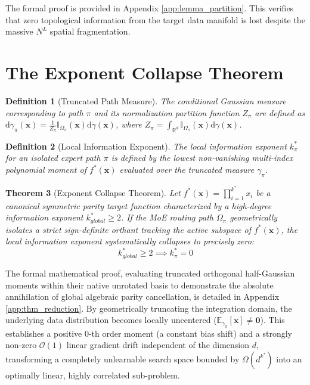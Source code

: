 \documentclass{article}
\newcommand{\E}{\mathbb{E}}
\newcommand{\R}{\mathbb{R}}
\newcommand{\1}{\mathbb{I}}
\newcommand{\diff}{\mathrm{d}}
\newcommand{\calO}{\mathcal{O}}
\newcommand{\bx}{\mathbf{x}}
\newtheorem{theorem}{Theorem}[section]
\newtheorem{definition}[theorem]{Definition}
\begin{document}
The formal proof is provided in Appendix \ref{app:lemma_partition}. This verifies that zero topological information from the target data manifold is lost despite the massive $N^L$ spatial fragmentation. 

\section{The Exponent Collapse Theorem}
\label{sec:collapse}

\begin{definition}[Truncated Path Measure] \label{def:truncated_measure}
The conditional Gaussian measure corresponding to path $\pi$ and its normalization partition function $Z_\pi$ are defined as $\diff\gamma_\pi(\bx) = \frac{1}{Z_\pi} \1_{\Omega_\pi}(\bx) \diff\gamma(\bx)$, where $Z_\pi = \int_{\R^d} \1_{\Omega_\pi}(\bx) \diff\gamma(\bx)$.
\end{definition}

\begin{definition}[Local Information Exponent] \label{def:local_exponent}
The local information exponent $k^*_\pi$ for an isolated expert path $\pi$ is defined by the lowest non-vanishing multi-index polynomial moment of $f^*(\bx)$ evaluated over the truncated measure $\gamma_\pi$.
\end{definition}

\begin{theorem}[Exponent Collapse Theorem] \label{thm:collapse}
Let $f^*(\bx) = \prod_{i=1}^{k^*} x_i$ be a canonical symmetric parity target function characterized by a high-degree information exponent $k_{global}^* \ge 2$. If the MoE routing path $\Omega_\pi$ geometrically isolates a strict sign-definite orthant tracking the active subspace of $f^*(\bx)$, the local information exponent systematically collapses to precisely zero:
\begin{equation}
    k_{global}^* \ge 2 \implies k^*_\pi = 0
\end{equation}
\end{theorem}
The formal mathematical proof, evaluating truncated orthogonal half-Gaussian moments within their native unrotated basis to demonstrate the absolute annihilation of global algebraic parity cancellation, is detailed in Appendix \ref{app:thm_reduction}. By geometrically truncating the integration domain, the underlying data distribution becomes locally uncentered ($\E_{\gamma_\pi}[\bx] \neq \mathbf{0}$). This establishes a positive 0-th order moment (a constant bias shift) and a strongly non-zero $\calO(1)$ linear gradient drift independent of the dimension $d$, transforming a completely unlearnable search space bounded by $\Omega(d^{k^*})$ into an optimally linear, highly correlated sub-problem.
\end{document}
